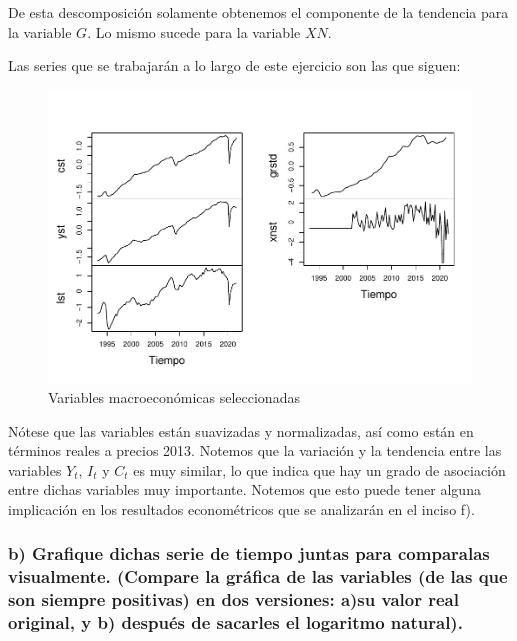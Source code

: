 \documentclass[
]{article}
\begin{document}
De esta descomposición solamente obtenemos el componente de la tendencia
para la variable \(G\). Lo mismo sucede para la variable \(XN\).

Las series que se trabajarán a lo largo de este ejercicio son las que
siguen:

\begin{figure}
\centering
\includegraphics{Ejercicio-3_files/figure-latex/unnamed-chunk-3-1.pdf}
\caption{Variables macroeconómicas seleccionadas}
\end{figure}

Nótese que las variables están suavizadas y normalizadas, así como están
en términos reales a precios 2013. Notemos que la variación y la
tendencia entre las variables \(Y_t\), \(I_t\) y \(C_t\) es muy similar,
lo que indica que hay un grado de asociación entre dichas variables muy
importante. Notemos que esto puede tener alguna implicación en los
resultados econométricos que se analizarán en el inciso f).

\hypertarget{b-grafique-dichas-serie-de-tiempo-juntas-para-comparalas-visualmente.-compare-la-gruxe1fica-de-las-variables-de-las-que-son-siempre-positivas-en-dos-versiones-asu-valor-real-original-y-b-despuuxe9s-de-sacarles-el-logaritmo-natural.}{%
\subsubsection{b) Grafique dichas serie de tiempo juntas para comparalas
visualmente. (Compare la gráfica de las variables (de las que son
siempre positivas) en dos versiones: a)su valor real original, y b)
después de sacarles el logaritmo
natural).}\label{b-grafique-dichas-serie-de-tiempo-juntas-para-comparalas-visualmente.-compare-la-gruxe1fica-de-las-variables-de-las-que-son-siempre-positivas-en-dos-versiones-asu-valor-real-original-y-b-despuuxe9s-de-sacarles-el-logaritmo-natural.}}
\end{document}
